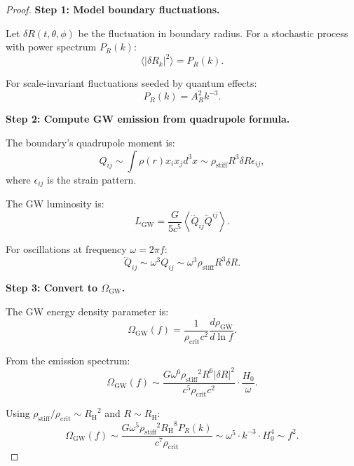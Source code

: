 \documentclass[11pt,a4paper]{article}
\newcommand{\rhocrit}{\ensuremath{\rho_{\mathrm{crit}}}}
\newcommand{\rhostiff}{\ensuremath{\rho_{\mathrm{stiff}}}}
\newcommand{\RH}{\ensuremath{R_{\mathrm{H}}}}
\theoremstyle{definition}
\theoremstyle{remark}
\begin{document}
\begin{proof}
\textbf{Step 1: Model boundary fluctuations.}

Let $\delta R(t, \theta, \phi)$ be the fluctuation in boundary radius. For a stochastic process with power spectrum $P_R(k)$:
\begin{equation}
\langle|\delta R_k|^2\rangle = P_R(k).
\end{equation}

For scale-invariant fluctuations seeded by quantum effects:
\begin{equation}
P_R(k) = A_R^2 k^{-3}.
\end{equation}

\textbf{Step 2: Compute GW emission from quadrupole formula.}

The boundary's quadrupole moment is:
\begin{equation}
Q_{ij} \sim \int \rho(r) x_i x_j d^3x \sim \rhostiff R^3 \delta R \epsilon_{ij},
\end{equation}
where $\epsilon_{ij}$ is the strain pattern.

The GW luminosity is:
\begin{equation}
L_{\mathrm{GW}} = \frac{G}{5c^5}\left\langle\dddot{Q}_{ij}\dddot{Q}^{ij}\right\rangle.
\end{equation}

For oscillations at frequency $\omega = 2\pi f$:
\begin{equation}
\dddot{Q}_{ij} \sim \omega^3 Q_{ij} \sim \omega^3 \rhostiff R^3 \delta R.
\end{equation}

\textbf{Step 3: Convert to $\Omega_{\mathrm{GW}}$.}

The GW energy density parameter is:
\begin{equation}
\Omega_{\mathrm{GW}}(f) = \frac{1}{\rhocrit c^2}\frac{d\rho_{\mathrm{GW}}}{d\ln f}.
\end{equation}

From the emission spectrum:
\begin{equation}
\Omega_{\mathrm{GW}}(f) \sim \frac{G\omega^6 \rhostiff^2 R^6 |\delta R|^2}{c^5 \rhocrit c^2} \cdot \frac{H_0}{\omega}.
\end{equation}

Using $\rhostiff/\rhocrit \sim \RH^2$ and $R \sim \RH$:
\begin{equation}
\Omega_{\mathrm{GW}}(f) \sim \frac{G\omega^5 \rhostiff^2 \RH^8 P_R(k)}{c^7 \rhocrit} \sim \omega^5 \cdot k^{-3} \cdot H_0^4 \sim f^2.
\end{equation}


\end{proof}
\end{document}
